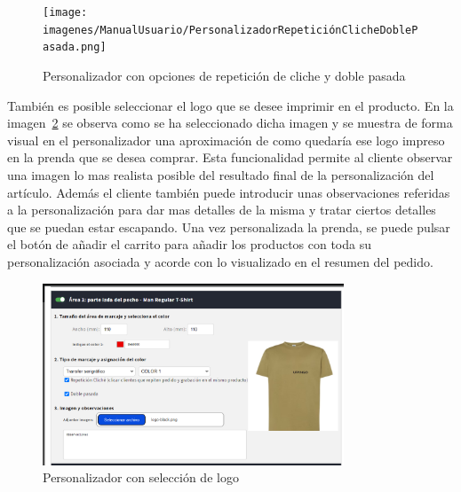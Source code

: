 \documentclass[12pt]{article}
\begin{document}
\begin{figure}[ht]
    \centering
    \texttt{[image: imagenes/ManualUsuario/PersonalizadorRepeticiónClicheDoblePasada.png]}
    \caption{\label{fig:PersonalizadorCheckboxes}Personalizador con opciones de repetición de cliche y doble pasada}
    \vspace{\fill}
\end{figure}

También es posible seleccionar el logo que se desee imprimir en el producto. En la imagen~\ref{fig:PersonalizadorLogo} se observa como se ha seleccionado dicha imagen y se muestra de forma visual en el personalizador una 
aproximación de como quedaría ese logo impreso en la prenda que se desea comprar. Esta funcionalidad permite al cliente observar una imagen lo mas realista posible del resultado final
de la personalización del artículo. Además el cliente también puede introducir unas observaciones referidas a la personalización para dar mas detalles de la misma y tratar ciertos detalles que se puedan
estar escapando. Una vez personalizada la prenda, se puede pulsar el botón de añadir el carrito para añadir los productos con toda su personalización asociada y acorde con
lo visualizado en el resumen del pedido.

\begin{figure}[ht]
    \centering
    \includegraphics[width=0.8\textwidth]{imagenes/ManualUsuario/PersonalizadorLogoSeleccionado.png}
    \caption{\label{fig:PersonalizadorLogo}Personalizador con selección de logo}
    \vspace{\fill}
\end{figure}
\end{document}
